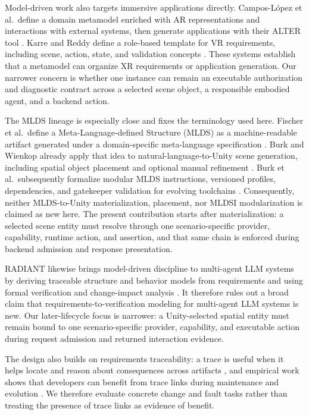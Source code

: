 Model-driven work also targets immersive applications directly. Campos-López
et al.\ define a domain metamodel enriched with AR representations and
interactions with external systems, then generate applications with their ALTER
tool \cite{camposlopez2023mdear}. Karre and Reddy define a role-based template
for VR requirements, including scene, action, state, and validation concepts
\cite{karre2024vrrequirements}. These systems establish that a metamodel can
organize XR requirements or application generation. Our narrower concern is
whether one instance can remain an executable authorization and diagnostic
contract across a selected scene object, a responsible embodied agent, and a
backend action.

The MLDS lineage is especially close and fixes the terminology used here.
Fischer et al.\ define a Meta-Language-defined Structure (MLDS) as a
machine-readable artifact generated under a domain-specific meta-language
specification \cite{fischer2025machinereadable}. Burk and Wienkop already apply
that idea to natural-language-to-Unity scene generation, including spatial
object placement and optional manual refinement
\cite{burk2025dynamicvr}. Burk et al.\ subsequently formalize modular MLDS
instructions, versioned profiles, dependencies, and gatekeeper validation for
evolving toolchains \cite{burk2026modular}. Consequently, neither
MLDS-to-Unity materialization, placement, nor MLDSI modularization is claimed as
new here. The present contribution starts after materialization: a selected
scene entity must resolve through one scenario-specific provider, capability,
runtime action, and assertion, and that same chain is enforced during backend
admission and response presentation.

RADIANT likewise brings model-driven discipline to multi-agent LLM systems by
deriving traceable structure and behavior models from requirements and using
formal verification and change-impact analysis \cite{wei2026radiant}. It
therefore rules out a broad claim that requirements-to-verification modeling
for multi-agent LLM systems is new. Our later-lifecycle focus is narrower: a
Unity-selected spatial entity must remain bound to one scenario-specific
provider, capability, and executable action during request admission and
returned interaction evidence.

The design also builds on requirements traceability: a trace is useful when it
helps locate and reason about consequences across artifacts
\cite{gotel1994traceability}, and empirical work shows that developers can
benefit from trace links during maintenance and evolution
\cite{maeder2015benefit}. We therefore evaluate concrete change and fault tasks
rather than treating the presence of trace links as evidence of benefit.

